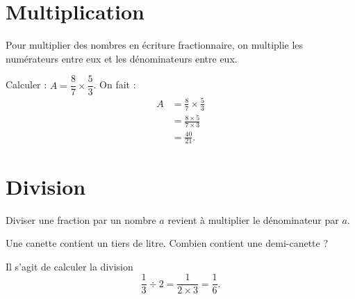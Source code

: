 \section{Multiplication}



\begin{Aretenir}
Pour multiplier des nombres en écriture fractionnaire, on multiplie les numérateurs entre eux et les dénominateurs entre eux.
\end{Aretenir}

\begin{example}
    Calculer : \( A=\dfrac{ 8 }{ 7 }\times \dfrac{ 5 }{ 3 }\). On fait :
    \begin{subequations}
        \begin{align}
            A&=\frac{ 8 }{ 7 }\times \frac{ 5 }{ 3 }\\
            &=\frac{ 8\times 5 }{ 7\times 3 }\\
            &=\frac{ 40 }{ 21 }.
        \end{align}
    \end{subequations}
\end{example}

\section{Division}
\label{SecDivision}



\begin{Aretenir}
   Diviser une fraction par un nombre \( a\) revient à multiplier le dénominateur par \( a\).
\end{Aretenir}


\begin{example}
    Une canette contient un tiers de litre. Combien contient une demi-canette ?

    Il s'agit de calculer la division
    \begin{equation}
        \dfrac{ 1 }{ 3 }\div 2=\frac{ 1 }{ 2\times 3 }=\frac{ 1 }{ 6 }.
    \end{equation}
\end{example}

